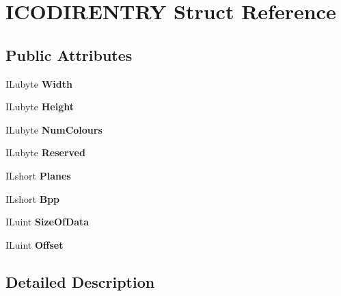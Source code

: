 \hypertarget{structICODIRENTRY}{}\section{I\+C\+O\+D\+I\+R\+E\+N\+T\+RY Struct Reference}
\label{structICODIRENTRY}
\subsection*{Public Attributes}
\begin{DoxyCompactItemize}
\item 
\mbox{\label{structICODIRENTRY_a4dd77ac4632069ff8a7d032f0adc5bfa}} 
I\+Lubyte {\bfseries Width}
\item 
\mbox{\label{structICODIRENTRY_a76fa67bdd9a8352457a3315e69e603b7}} 
I\+Lubyte {\bfseries Height}
\item 
\mbox{\label{structICODIRENTRY_aae615ea0fc3b2b9cdaa01af0a9033812}} 
I\+Lubyte {\bfseries Num\+Colours}
\item 
\mbox{\label{structICODIRENTRY_a37f24d9c43b022034f9ac24d77c0abe0}} 
I\+Lubyte {\bfseries Reserved}
\item 
\mbox{\label{structICODIRENTRY_a13658b340b4a94c90f34c5542f15aa55}} 
I\+Lshort {\bfseries Planes}
\item 
\mbox{\label{structICODIRENTRY_ab3d8137c20c93f2e9f293d3cbe38ffb1}} 
I\+Lshort {\bfseries Bpp}
\item 
\mbox{\label{structICODIRENTRY_ae84ee221bf1b8ff277a803b7b127d3bb}} 
I\+Luint {\bfseries Size\+Of\+Data}
\item 
\mbox{\label{structICODIRENTRY_a1919b8fdb7d9da61056bb96e5661768f}} 
I\+Luint {\bfseries Offset}
\end{DoxyCompactItemize}


\subsection{Detailed Description}


